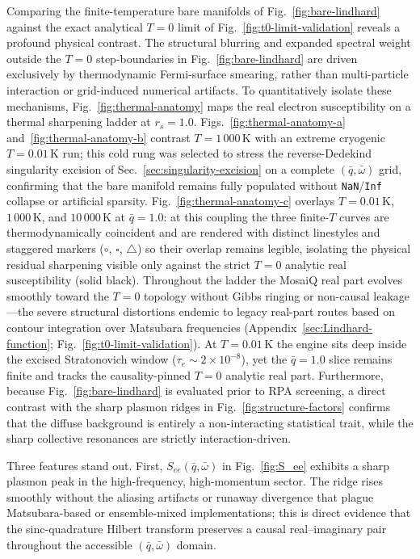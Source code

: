 \documentclass[aps,showkeys,noshowpacs,superscriptaddress,pre,preprint]{revtex4-2}
\begin{document}
Comparing the finite-temperature bare manifolds of Fig.~\ref{fig:bare-lindhard} against the exact analytical $T=0$ limit of Fig.~\ref{fig:t0-limit-validation} reveals a profound physical contrast.
The structural blurring and expanded spectral weight outside the $T=0$ step-boundaries in Fig.~\ref{fig:bare-lindhard} are driven exclusively by thermodynamic Fermi-surface smearing, rather than multi-particle interaction or grid-induced numerical artifacts.
To quantitatively isolate these mechanisms, Fig.~\ref{fig:thermal-anatomy} maps the real electron susceptibility on a thermal sharpening ladder at $r_s=1.0$.
Figs.~\ref{fig:thermal-anatomy-a} and~\ref{fig:thermal-anatomy-b} contrast $T=1\,000\,\mathrm{K}$ with an extreme cryogenic $T=0.01\,\mathrm{K}$ run; this cold rung was selected to stress the reverse-Dedekind singularity excision of Sec.~\ref{sec:singularity-excision} on a complete $(\bar{q},\bar{\omega})$ grid, confirming that the bare manifold remains fully populated without \texttt{NaN}/\texttt{Inf} collapse or artificial sparsity.
Fig.~\ref{fig:thermal-anatomy-c} overlays $T=0.01\,\mathrm{K}$, $1\,000\,\mathrm{K}$, and $10\,000\,\mathrm{K}$ at $\bar{q}=1.0$: at this coupling the three finite-$T$ curves are thermodynamically coincident and are rendered with distinct linestyles and staggered markers ($\circ$, $\square$, $\triangle$) so their overlap remains legible, isolating the physical residual sharpening visible only against the strict $T=0$ analytic real susceptibility (solid black).
Throughout the ladder the MosaiQ real part evolves smoothly toward the $T=0$ topology without Gibbs ringing or non-causal leakage---the severe structural distortions endemic to legacy real-part routes based on contour integration over Matsubara frequencies (Appendix~\ref{sec:Lindhard-function}; Fig.~\ref{fig:t0-limit-validation}).
At $T=0.01\,\mathrm{K}$ the engine sits deep inside the excised Stratonovich window ($\tau_e \sim 2\times 10^{-8}$), yet the $\bar{q}=1.0$ slice remains finite and tracks the causality-pinned $T=0$ analytic real part.
Furthermore, because Fig.~\ref{fig:bare-lindhard} is evaluated prior to RPA screening, a direct contrast with the sharp plasmon ridges in Fig.~\ref{fig:structure-factors} confirms that the diffuse background is entirely a non-interacting statistical trait, while the sharp collective resonances are strictly interaction-driven.

Three features stand out.
First, $S_{ee}(\bar{q}, \bar{\omega})$ in Fig.~\ref{fig:S_ee} exhibits a sharp plasmon peak in the high-frequency, high-momentum sector.
The ridge rises smoothly without the aliasing artifacts or runaway divergence that plague
Matsubara-based or ensemble-mixed implementations;
this is direct evidence that the sinc-quadrature Hilbert transform preserves a causal real--imaginary pair
throughout the accessible $(\bar{q}, \bar{\omega})$ domain.
\end{document}
